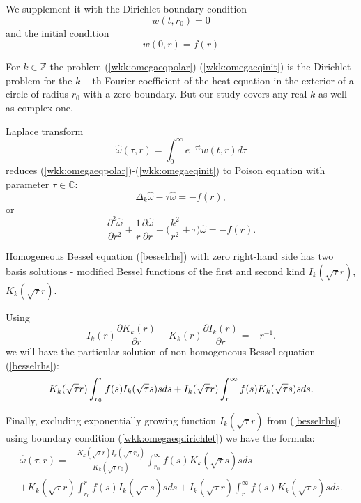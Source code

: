 \documentclass[manuscript, printscheme]{paper}
\newcommand{\ZM}{\mathbb{Z}}
\newcommand{\CM}{\mathbb{C}}
\begin{document}
We supplement it with the Dirichlet boundary condition
\begin{equation} \label{wkk:omegaeqdirichlet}
w(t,r_0) = 0
\end{equation}
and the initial condition
\begin{equation} \label{wkk:omegaeqinit}
w(0,r) = f(r)
\end{equation}

For $k\in \ZM$ the problem (\ref{wkk:omegaeqpolar})-(\ref{wkk:omegaeqinit}) is the Dirichlet problem for the $k-$th Fourier coefficient of the heat equation in the exterior of a circle of radius $r_0$ with a zero boundary. But our study covers any real $k$ as well as complex one.

Laplace transform
$$
 \hat \omega(\tau,r )=\int_0^\infty e^{-\tau t}w(t,r) d\tau
$$
reduces (\ref{wkk:omegaeqpolar})-(\ref{wkk:omegaeqinit}) to Poison equation with parameter $\tau \in \CM$:
\begin{equation}\label{poison}
\Delta_k \hat \omega - \tau \hat \omega  = - f(r),
\end{equation}
or
\begin{equation} \label{besselrhs}
 \frac{\partial^2 \hat \omega}{\partial r^2} + \frac1r \frac{\partial \hat \omega}{\partial r} - \Big(\frac{k^2}{r^2} + \tau \Big) \hat \omega = -f(r).
\end{equation}
 
Homogeneous Bessel equation (\ref{besselrhs}) with zero right-hand side has two basis solutions -  modified Bessel functions of the first and second kind $I_k(\sqrt{\tau}r)$, $K_k(\sqrt{\tau}r)$.

Using
\begin{equation*}\label{wronsk}
I_k(r) \frac{\partial K_k(r)}{\partial r}-
K_k(r) \frac{\partial I_k(r)}{\partial r}=-r^{-1}.
\end{equation*}
we will have the particular solution of non-homogeneous Bessel equation (\ref{besselrhs}):
$$K_k(\sqrt{\tau}r)\int_{r_0}^r f(s) I_k(\sqrt{\tau}s) s ds \nonumber \\ + 
I_k(\sqrt{\tau}r)\int_r^{\infty} f(s) K_k(\sqrt{\tau}s) s ds. $$

Finally, excluding exponentially growing function $I_k(\sqrt{\tau}r)$ from (\ref{besselrhs}) using boundary condition (\ref{wkk:omegaeqdirichlet}) we have the formula: 
\begin{align} \label{directsol}
 \hat \omega(\tau,r) = - \frac{K_k(\sqrt{\tau}r)I_k(\sqrt{\tau}r_0)}{K_k(\sqrt{\tau}r_0)} \int_{r_0}^{\infty} f(s) K_k(\sqrt{\tau}s) s ds \\ + K_k(\sqrt{\tau}r)\int_{r_0}^r f(s) I_k(\sqrt{\tau}s) s ds \nonumber  + 
I_k(\sqrt{\tau}r)\int_r^{\infty} f(s) K_k(\sqrt{\tau}s) s ds.
\end{align}
\end{document}
